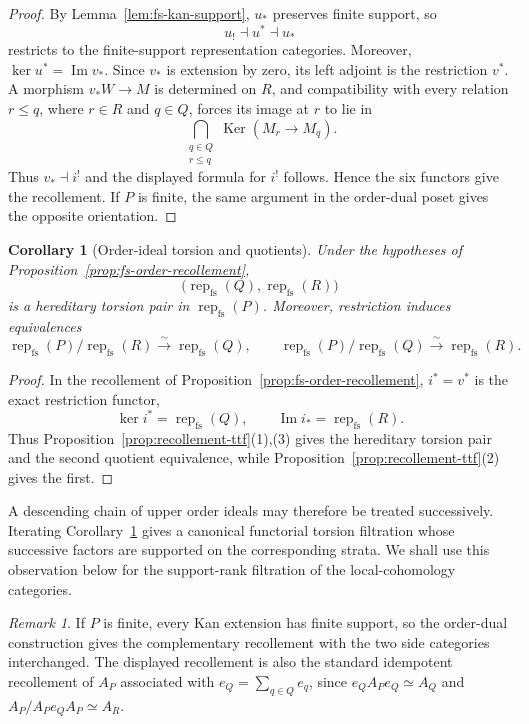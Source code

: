 \documentclass[12pt,reqno]{amsart}
\newtheorem{corollary}[theorem]{Corollary}
\theoremstyle{definition}
\theoremstyle{remark}
\newtheorem{remark}[theorem]{Remark}
\newcommand{\Rep}{\operatorname{rep}}
\begin{document}
\begin{proof}
By Lemma~\ref{lem:fs-kan-support}, $u_*$ preserves finite support, so
\[
u_!\dashv u^*\dashv u_*
\]
restricts to the finite-support representation categories.  Moreover,
$\ker u^*=\operatorname{Im}v_*$.  Since $v_*$ is extension by zero, its
left adjoint is the restriction $v^*$.  A morphism $v_*W\to M$ is determined
on $R$, and compatibility with every relation $r\le q$, where $r\in R$ and
$q\in Q$, forces its image at $r$ to lie in
\[
\bigcap_{\substack{q\in Q\\ r\le q}}
\operatorname{Ker}(M_r\longrightarrow M_q).
\]
Thus $v_*\dashv i^!$ and the displayed formula for $i^!$ follows.  Hence the
six functors give the recollement.  If $P$ is finite, the same argument in the
order-dual poset gives the opposite orientation.
\end{proof}

\begin{corollary}[Order-ideal torsion and quotients]
\label{cor:order-ideal-consequences}
Under the hypotheses of Proposition~\ref{prop:fs-order-recollement},
\[
\bigl(\Rep_{\mathrm{fs}}(Q),\Rep_{\mathrm{fs}}(R)\bigr)
\]
is a hereditary torsion pair in $\Rep_{\mathrm{fs}}(P)$.  Moreover,
restriction induces equivalences
\[
\Rep_{\mathrm{fs}}(P)/\Rep_{\mathrm{fs}}(R)
\xrightarrow{\sim}\Rep_{\mathrm{fs}}(Q),
\qquad
\Rep_{\mathrm{fs}}(P)/\Rep_{\mathrm{fs}}(Q)
\xrightarrow{\sim}\Rep_{\mathrm{fs}}(R).
\]
\end{corollary}

\begin{proof}
In the recollement of Proposition~\ref{prop:fs-order-recollement},
$i^*=v^*$ is the exact restriction functor,
\[
\ker i^*=\Rep_{\mathrm{fs}}(Q),
\qquad
\operatorname{Im}i_*=\Rep_{\mathrm{fs}}(R).
\]
Thus Proposition~\ref{prop:recollement-ttf}(1),(3) gives the hereditary
torsion pair and the second quotient equivalence, while
Proposition~\ref{prop:recollement-ttf}(2) gives the first.
\end{proof}


A descending chain of upper order ideals may therefore be treated
successively.  Iterating Corollary~\ref{cor:order-ideal-consequences} gives a
canonical functorial torsion filtration whose successive factors are supported
on the corresponding strata.  We shall use this observation below for the
support-rank filtration of the local-cohomology categories.

\begin{remark}\label{rem:finite-complementary-recollements}
If $P$ is finite, every Kan extension has finite support, so the order-dual
construction gives the complementary recollement with the two side categories
interchanged.  The displayed recollement is also the standard idempotent
recollement of $A_P$ associated with $e_Q=\sum_{q\in Q}e_q$, since
$e_QA_Pe_Q\simeq A_Q$ and $A_P/A_Pe_QA_P\simeq A_R$.
\end{remark}
\end{document}
